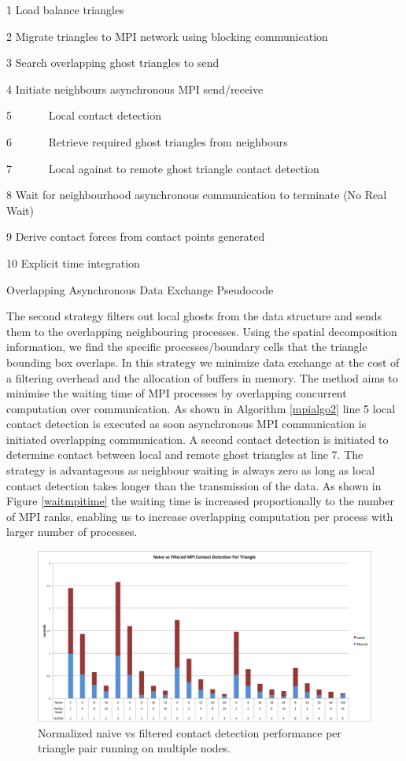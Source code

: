 \documentclass[times,12pt]{article}
\begin{document}
\begin{algorithm}
1 Load balance triangles

2 Migrate triangles to MPI network using blocking communication

3 Search overlapping ghost triangles to send

4 Initiate neighbours asynchronous MPI send/receive

5 ~~~~~~Local contact detection

6 ~~~~~~Retrieve required ghost triangles from neighbours

7 ~~~~~~Local against to remote ghost triangle contact detection

8 Wait for neighbourhood asynchronous communication to terminate (No Real Wait)

9 Derive contact forces from contact points generated

10 Explicit time integration

\protect\caption{\label{mpialgo2}Overlapping Asynchronous Data Exchange Pseudocode}
\end{algorithm}

The second strategy filters out local ghosts from the data structure and sends them to the overlapping neighbouring processes. Using the spatial decomposition information, we find the specific processes/boundary cells that the triangle bounding box overlaps. In this strategy we minimize data exchange at the cost of a filtering overhead and the allocation of buffers in memory. The method aims to minimise the waiting time of MPI processes by overlapping concurrent computation over communication. As shown in Algorithm \ref{mpialgo2} line 5 local contact detection is executed as soon asynchronous MPI communication is initiated overlapping communication. A second contact detection is initiated to determine contact between local and remote ghost triangles at line 7. The strategy is advantageous as neighbour waiting is always zero as long as local contact detection takes longer than the transmission of the data. As shown in Figure \ref{waitmpitime} the waiting time is increased proportionally to the number of MPI ranks, enabling us to increase overlapping computation per process with larger number of processes.

\begin{figure}[!h]
\centering
\includegraphics[width=1\textwidth]{mpi} \protect\caption{\label{mpiscale}Normalized naive vs filtered contact detection performance per triangle pair running on multiple nodes.}
\end{figure}
\end{document}
